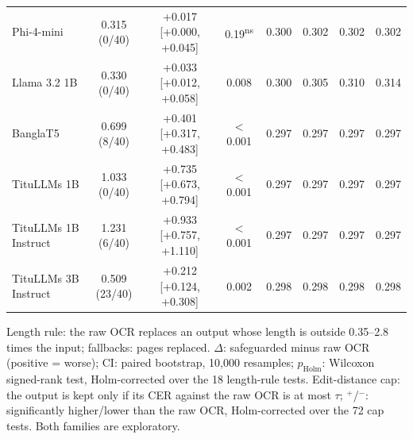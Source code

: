 \begin{table}[t]
\begin{tabular}{lccccccc}
Phi-4-mini & 0.315 (0/40) & +0.017 [+0.000, +0.045] & 0.19\textsuperscript{ns} & 0.300 & 0.302 & 0.302 & 0.302 \\
Llama 3.2 1B & 0.330 (0/40) & +0.033 [+0.012, +0.058] & 0.008 & 0.300 & 0.305 & 0.310 & 0.314 \\
BanglaT5 & 0.699 (8/40) & +0.401 [+0.317, +0.483] & $<$0.001 & 0.297 & 0.297 & 0.297 & 0.297 \\
TituLLMs 1B & 1.033 (0/40) & +0.735 [+0.673, +0.794] & $<$0.001 & 0.297 & 0.297 & 0.297 & 0.297 \\
TituLLMs 1B Instruct & 1.231 (6/40) & +0.933 [+0.757, +1.110] & $<$0.001 & 0.297 & 0.297 & 0.297 & 0.297 \\
TituLLMs 3B Instruct & 0.509 (23/40) & +0.212 [+0.124, +0.308] & 0.002 & 0.298 & 0.298 & 0.298 & 0.298 \\
\bottomrule
\end{tabular}
\par\smallskip
\begin{minipage}{\linewidth}\footnotesize Length rule: the raw OCR replaces an output whose length is outside 0.35--2.8 times the input; fallbacks: pages replaced. $\Delta$: safeguarded minus raw OCR (positive = worse); CI: paired bootstrap, 10{,}000 resamples; $p_{\mathrm{Holm}}$: Wilcoxon signed-rank test, Holm-corrected over the 18 length-rule tests. Edit-distance cap: the output is kept only if its CER against the raw OCR is at most $\tau$; $^{+}$/$^{-}$: significantly higher/lower than the raw OCR, Holm-corrected over the 72 cap tests. Both families are exploratory.\end{minipage}
\end{table}
